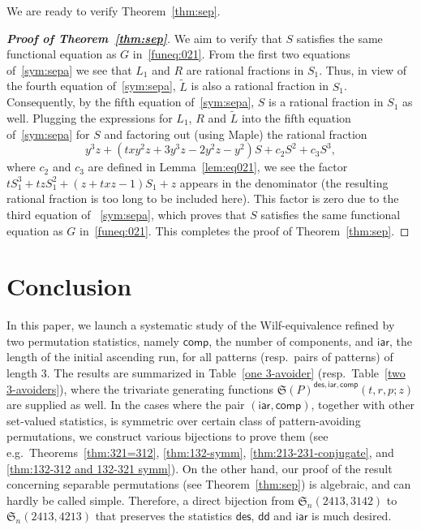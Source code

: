 \documentclass[12pt]{amsart}
\numberwithin{equation}{section}
\theoremstyle{plain}
\theoremstyle{definition}
\def\des{\mathsf{des}}
\def\S{\mathfrak{S}}
\def\iar{\mathsf{iar}}
\def\comp{\mathsf{comp}}
\def\dd{\mathsf{dd}}
\begin{document}
We are ready to verify  Theorem~\ref{thm:sep}. 

\begin{proof}[{\bf Proof of  Theorem~\ref{thm:sep}}] We aim to verify that $S$ satisfies the same functional equation as $G$ in~\eqref{funeq:021}. From the first two equations of~\eqref{sym:sepa} we see that $L_1$ and $R$ are rational fractions in $S_1$. Thus, in view of the fourth equation of~\eqref{sym:sepa},  $\tilde L$ is also a rational fraction in $S_1$. Consequently, by the fifth equation of~\eqref{sym:sepa}, $S$ is a rational fraction in $S_1$ as well. Plugging the expressions for $L_1$, $R$ and $\tilde L$ into the fifth equation of~\eqref{sym:sepa} for $S$ and factoring out (using Maple) the rational fraction 
$$
y^3z+(txy^2z+3y^3z-2y^2z-y^2)S+c_2S^2+c_3S^3,
$$
where $c_2$ and $c_3$ are defined in Lemma~\ref{lem:eq021}, we see the factor $tS_1^3+tzS_1^2+(z+txz-1)S_1+z$ appears in the denominator (the resulting rational fraction is too long to be included here). This factor is zero due to the third equation of ~\eqref{sym:sepa}, which proves that $S$ satisfies the same functional equation as $G$ in~\eqref{funeq:021}. This completes the proof of Theorem~\ref{thm:sep}.
\end{proof}


\section{Conclusion}\label{sec:conclusion}

In this paper, we launch a systematic study of the Wilf-equivalence refined by two permutation statistics, namely $\comp$, the number of components, and $\iar$, the length of the initial ascending run, for all patterns (resp.~pairs of patterns) of length $3$. The results are summarized in Table~\ref{one 3-avoider} (resp.~Table~\ref{two 3-avoiders}), where the trivariate generating functions $\S(P)^{\des,\iar,\comp}(t,r,p;z)$ are supplied as well. In the cases where the pair $(\iar,\comp)$, together with other set-valued statistics, is symmetric over certain class of pattern-avoiding permutations, we construct various bijections to prove them (see e.g.~Theorems~\ref{thm:321=312}, \ref{thm:132-symm}, \ref{thm:213-231-conjugate}, and \ref{thm:132-312 and 132-321 symm}). On the other hand, our proof of the result concerning separable permutations (see Theorem~\ref{thm:sep}) is algebraic, and can hardly be called simple. Therefore, a direct bijection from $\S_n(2413,3142)$ to $\S_n(2413,4213)$ that preserves the statistics $\des$, $\dd$ and $\iar$ is much desired. 
\end{document}
